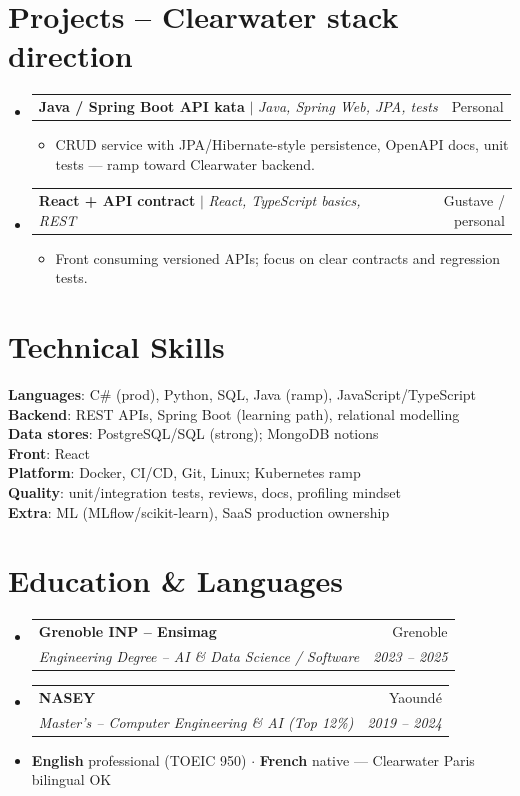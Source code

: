 \documentclass[letterpaper,10.5pt]{article}
\makeatletter
\newcommand{\resumeItem}[1]{\item\small{#1}}
\newcommand{\resumeSubheading}[4]{\vspace{3pt}\item\begin{tabular*}{0.97\textwidth}[t]{l@{\extracolsep{\fill}}r}\textbf{#1}&{#2}\\\textit{\small #3}&\textit{\small #4}\\\end{tabular*}\vspace{1pt}}
\newcommand{\resumeProjectHeading}[2]{\vspace{2pt}\item\begin{tabular*}{0.97\textwidth}{l@{\extracolsep{\fill}}r}\small #1&#2\\\end{tabular*}\vspace{1pt}}
\newcommand{\resumeSubHeadingListStart}{\begin{itemize}[leftmargin=0.08in,label={}]}
\newcommand{\resumeSubHeadingListEnd}{\end{itemize}}
\makeatother
\begin{document}
\section{Projects -- Clearwater stack direction}
\resumeSubHeadingListStart
  \resumeProjectHeading{\textbf{Java / Spring Boot API kata} $|$ \emph{Java, Spring Web, JPA, tests}}{Personal}
  \begin{itemize}\resumeItem{CRUD service with JPA/Hibernate-style persistence, OpenAPI docs, unit tests --- ramp toward Clearwater backend.}\end{itemize}
  \resumeProjectHeading{\textbf{React + API contract} $|$ \emph{React, TypeScript basics, REST}}{Gustave / personal}
  \begin{itemize}\resumeItem{Front consuming versioned APIs; focus on clear contracts and regression tests.}\end{itemize}
\resumeSubHeadingListEnd

\section{Technical Skills}
\begin{itemize}[leftmargin=0.08in,label={}]\small{\item{
\textbf{Languages}: C\# (prod), Python, SQL, Java (ramp), JavaScript/TypeScript \\
\textbf{Backend}: REST APIs, Spring Boot (learning path), relational modelling \\
\textbf{Data stores}: PostgreSQL/SQL (strong); MongoDB notions \\
\textbf{Front}: React \\
\textbf{Platform}: Docker, CI/CD, Git, Linux; Kubernetes ramp \\
\textbf{Quality}: unit/integration tests, reviews, docs, profiling mindset \\
\textbf{Extra}: ML (MLflow/scikit-learn), SaaS production ownership
}}\end{itemize}

\section{Education \& Languages}
\resumeSubHeadingListStart
  \resumeSubheading{Grenoble INP -- Ensimag}{Grenoble}{Engineering Degree -- AI \& Data Science / Software}{2023 -- 2025}
  \resumeSubheading{NASEY}{Yaound\'e}{Master's -- Computer Engineering \& AI (Top 12\%)}{2019 -- 2024}
\resumeSubHeadingListEnd
\begin{itemize}[leftmargin=0.08in,label={}]\item \textbf{English} professional (TOEIC 950) $\cdot$ \textbf{French} native --- Clearwater Paris bilingual OK\end{itemize}
\end{document}

